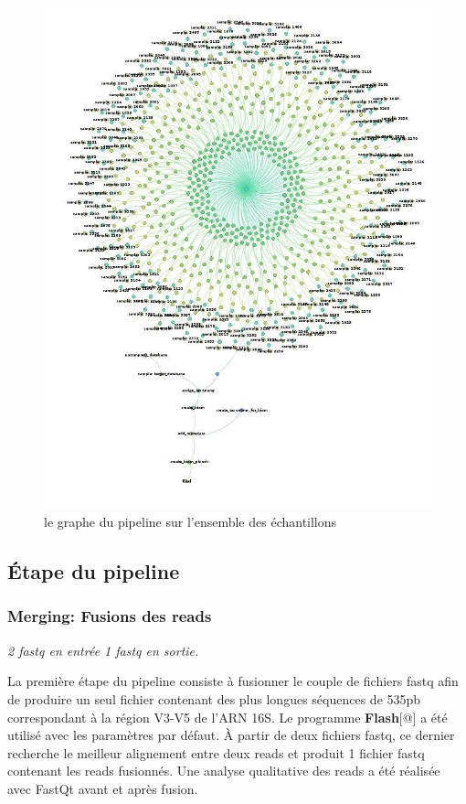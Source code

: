 \documentclass[12pt,a4paper]{article}
\begin{document}
\begin{figure}[ht]
\begin{center}
\includegraphics[scale=0.4]{img/dag.jpg}\hfill
\end{center}
\caption{le graphe du pipeline sur l'ensemble des échantillons}
\label{dag}
\end{figure}

\subsection{Étape du pipeline}
\subsubsection{Merging: Fusions des reads}\begin{center}\emph{ 2 fastq en entrée 1 fastq en sortie. } \end{center}

La première étape du pipeline consiste à fusionner le couple de fichiers fastq afin de produire un seul fichier contenant des plus longues séquences de 535pb correspondant à la région V3-V5 de l’ARN 16S.
Le programme \textbf{Flash}[@] a été utilisé avec les paramètres par défaut. À partir de deux fichiers fastq, ce dernier recherche le meilleur alignement entre deux reads et produit 1 fichier fastq contenant les reads fusionnés.
Une analyse qualitative des reads a été réalisée avec FastQt\citep{Beck} avant et après fusion.
\end{document}
